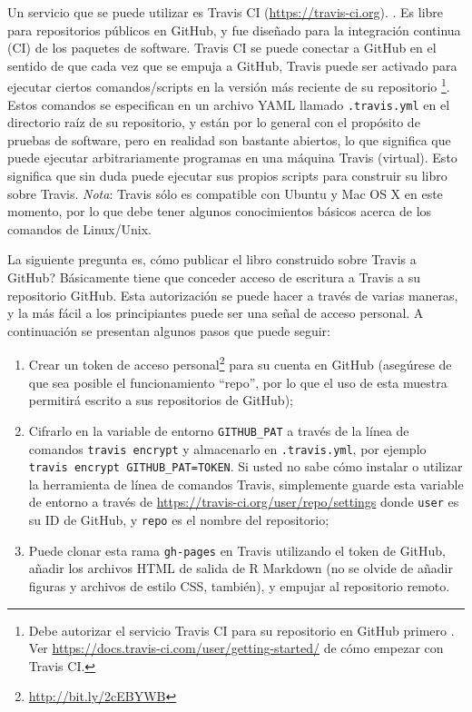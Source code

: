 \documentclass[12pt,]{krantz}
\providecommand{\tightlist}{%
  \setlength{\itemsep}{0pt}\setlength{\parskip}{0pt}}
\renewcommand{\href}[2]{#2\footnote{\url{#1}}}
\theoremstyle{definition}
\theoremstyle{definition}
\theoremstyle{definition}
\theoremstyle{remark}
\begin{document}
Un servicio que se puede utilizar es Travis CI
(\url{https://travis-ci.org}). . Es libre para
repositorios públicos en GitHub, y fue diseñado para la integración
continua (CI) de los paquetes de software. Travis CI se puede conectar a
GitHub en el sentido de que cada vez que se empuja a GitHub, Travis
puede ser activado para ejecutar ciertos comandos/scripts en la versión
más reciente de su repositorio \footnote{Debe autorizar el servicio
  Travis CI para su repositorio en GitHub primero . Ver
  \url{https://docs.travis-ci.com/user/getting-started/} de cómo empezar
  con Travis CI.}. Estos comandos se especifican en un archivo YAML
llamado \texttt{.travis.yml} en el directorio raíz de su repositorio, y
están por lo general con el propósito de pruebas de software, pero en
realidad son bastante abiertos, lo que significa que puede ejecutar
arbitrariamente programas en una máquina Travis (virtual). Esto
significa que sin duda puede ejecutar sus propios scripts para construir
su libro sobre Travis. \emph{Nota}: Travis sólo es compatible con Ubuntu
y Mac OS X en este momento, por lo que debe tener algunos conocimientos
básicos acerca de los comandos de Linux/Unix.

La siguiente pregunta es, cómo publicar el libro construido sobre Travis
a GitHub? Básicamente tiene que conceder acceso de escritura a Travis a
su repositorio GitHub. Esta autorización se puede hacer a través de
varias maneras, y la más fácil a los principiantes puede ser una señal
de acceso personal. A continuación se presentan algunos pasos que puede
seguir:

\begin{enumerate}
\def\labelenumi{\arabic{enumi}.}
\tightlist
\item
  Crear un \href{http://bit.ly/2cEBYWB}{token de acceso personal} para
  su cuenta en GitHub (asegúrese de que sea posible el funcionamiento
  ``repo'', por lo que el uso de esta muestra permitirá escrito a sus
  repositorios de GitHub);
\item
  Cifrarlo en la variable de entorno \texttt{GITHUB\_PAT} a través de la
  línea de comandos \texttt{travis\ encrypt} y almacenarlo en
  \texttt{.travis.yml}, por ejemplo
  \texttt{travis\ encrypt\ GITHUB\_PAT=TOKEN}. Si usted no sabe cómo
  instalar o utilizar la herramienta de línea de comandos Travis,
  simplemente guarde esta variable de entorno a través de
  \url{https://travis-ci.org/user/repo/settings} donde \texttt{user} es
  su ID de GitHub, y \texttt{repo} es el nombre del repositorio;
\item
  Puede clonar esta rama \texttt{gh-pages} en Travis utilizando el token
  de GitHub, añadir los archivos HTML de salida de R Markdown (no se
  olvide de añadir figuras y archivos de estilo CSS, también), y empujar
  al repositorio remoto.
\end{enumerate}
\end{document}
